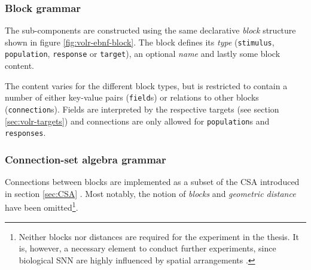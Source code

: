 \subsubsection{Block grammar} \label{sec:volr-block}
The sub-components are constructed using the same declarative \textit{block}
structure shown in figure \ref{fig:volr-ebnf-block}.
The block defines its \textit{type} (\texttt{stimulus}, \texttt{population},
\texttt{response} or \texttt{target}), an optional \textit{name} and lastly
some block content.

The content varies for the different block types, but is restricted to contain
a number of either key-value pairs (\texttt{field}s) or relations to other
blocks (\texttt{connection}s).
Fields are interpreted by the respective targets (see section
\ref{sec:volr-targets}) and connections are only allowed for
\texttt{population}s and \texttt{responses}.

\subsubsection{Connection-set algebra grammar} \label{sec:volr-csa}
Connections between blocks are implemented as a subset of the \gls{CSA}
introduced in section \ref{sec:CSA} \autocite{Djurfeldt2012}.
Most notably, the notion of \textit{blocks} and \textit{geometric distance} have
been omitted\footnote{Neither blocks nor distances are required for the
  experiment in the thesis. It is, however, a necessary element to conduct
  further experiments, since biological \gls{SNN} are highly influenced by
  spatial arrangements \autocite{dayan2001}.
}.

